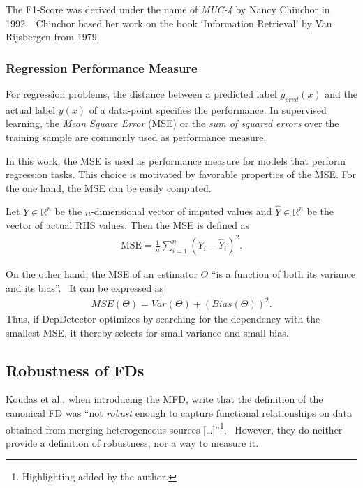 The F1-Score was derived under the name of \emph{MUC-4} by Nancy Chinchor in 1992.~\cite{CHI92}
Chinchor based her work on the book `Information Retrieval' by Van Rijsbergen from 1979.~\cite{RIJ79}

\subsubsection{Regression Performance Measure}
For regression problems, the distance between a predicted label \( y_{pred}(x) \) and the actual label \( y(x) \)  of a data-point specifies the performance.
In supervised learning, the \emph{Mean Square Error} (MSE) or the \emph{sum of squared errors} over the training sample are commonly used as performance measure.~\cite[p.~35]{HAY08}

In this work, the MSE is used as performance measure for models that perform regression tasks.
This choice is motivated by favorable properties of the MSE.
For the one hand, the MSE can be easily computed.

Let \( Y \in \mathbb{R}^{n}\) be the \( n \)-dimensional vector of imputed values and \( \hat{Y} \in \mathbb{R}^{n} \) be the vector of actual RHS values.
Then the MSE is defined as~\cite[p.~597]{MOO11}
\begin{align}\label{eq:fd-imputer-mse}
\text{MSE} = \frac{1}{n}\sum_{i=1}^{n} \left(Y_i - \hat{Y}_i\right)^2.
\end{align}

On the other hand, the MSE of an estimator \( \Theta \) ``is a function of both its variance and its bias''.~\cite[p.~393]{WAC08}
It can be expressed as
\begin{align*}
    MSE(\Theta) = Var(\Theta) + \left(Bias(\Theta)\right)^2.
\end{align*}
Thus, if DepDetector optimizes by searching for the dependency with the smallest MSE, it thereby selects for small variance and small bias.

\subsection{Robustness of FDs}
Koudas et al., when introducing the MFD, write that the definition of the canonical FD was ``not \emph{robust} enough to capture functional relationships on data obtained from merging heterogeneous sources [\dots]''\footnote{Highlighting added by the author.}.~\cite[p.~1]{KOU09}
However, they do neither provide a definition of robustness, nor a way to measure it.

